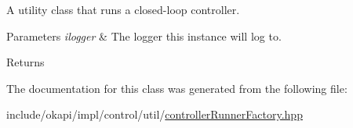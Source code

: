 A utility class that runs a closed-\/loop controller.


\begin{DoxyParams}{Parameters}
{\em ilogger} & The logger this instance will log to. \\
\hline
\end{DoxyParams}
\begin{DoxyReturn}{Returns}

\end{DoxyReturn}


The documentation for this class was generated from the following file\+:\begin{DoxyCompactItemize}
\item 
include/okapi/impl/control/util/\mbox{\hyperlink{controllerRunnerFactory_8hpp}{controller\+Runner\+Factory.\+hpp}}\end{DoxyCompactItemize}
